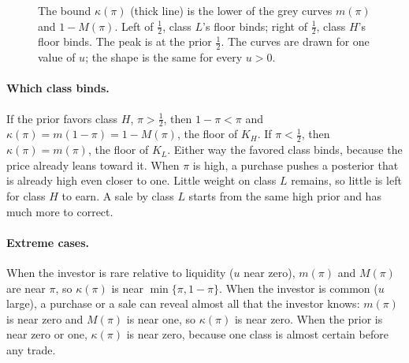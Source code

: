 \begin{figure}[htbp]
\centering
{}
\caption{The bound \(\kappa(\pi)\) (thick line) is the lower of the grey curves \(m(\pi)\) and \(1-M(\pi)\). Left
of \(\tfrac12\), class \(L\)'s floor binds; right of \(\tfrac12\), class \(H\)'s floor binds. The peak is at the
prior \(\tfrac12\). The curves are drawn for one value of \(u\); the shape is the same for every \(u>0\).}
\label{fig:trading-kappa}
\end{figure}

\paragraph{Which class binds.} If the prior favors class \(H\), \(\pi>\tfrac12\), then \(1-\pi<\pi\) and
\(\kappa(\pi)=m(1-\pi)=1-M(\pi)\), the floor of \(K_H\). If \(\pi<\tfrac12\), then \(\kappa(\pi)=m(\pi)\), the floor
of \(K_L\). Either way the favored class binds, because the price already leans toward it. When \(\pi\) is high, a
purchase pushes a posterior that is already high even closer to one. Little weight on class \(L\) remains, so little
is left for class \(H\) to earn. A sale by class \(L\) starts from the same high prior and has much more to correct.

\paragraph{Extreme cases.} When the investor is rare relative to liquidity (\(u\) near zero), \(m(\pi)\) and
\(M(\pi)\) are near \(\pi\), so \(\kappa(\pi)\) is near \(\min\{\pi,1-\pi\}\). When the investor is common (\(u\)
large), a purchase or a sale can reveal almost all that the investor knows: \(m(\pi)\) is near zero and \(M(\pi)\)
is near one, so \(\kappa(\pi)\) is near zero. When the prior is near zero or one,
\(\kappa(\pi)\) is near zero, because one class is almost certain before any trade.

